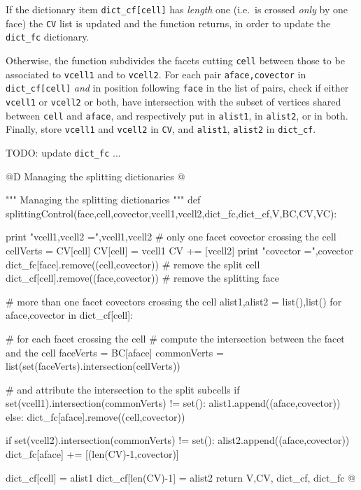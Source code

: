 \documentclass[11pt,oneside]{article}	%
\begin{document}
If the dictionary item \texttt{dict\_cf[cell]} has \emph{length} one (i.e.~is crossed  \emph{only} by one face) the \texttt{CV} list is updated and the function returns, in order to update the \texttt{dict\_fc} dictionary.

Otherwise, the function subdivides the facets cutting \texttt{cell} between those to be associated to \texttt{vcell1} and to \texttt{vcell2}. 
For each pair \texttt{aface,covector} in \texttt{dict\_cf[cell]} \emph{and} in position following \texttt{face} in the list of pairs, check if either \texttt{vcell1} or \texttt{vcell2} or both, have intersection with the subset of vertices shared between \texttt{cell} and \texttt{aface}, and respectively put in \texttt{alist1}, in \texttt{alist2}, or in both.
Finally, store \texttt{vcell1} and \texttt{vcell2} in \texttt{CV}, and \texttt{alist1}, \texttt{alist2} in \texttt{dict\_cf}.

TODO: update \texttt{dict\_fc} ...

@D Managing the splitting dictionaries
@{""" Managing the splitting dictionaries """
def splittingControl(face,cell,covector,vcell1,vcell2,dict_fc,dict_cf,V,BC,CV,VC):

   print "vcell1,vcell2 =",vcell1,vcell2
   # only one facet covector crossing the cell
   cellVerts = CV[cell]
   CV[cell] = vcell1
   CV += [vcell2]
   print "covector =",covector
   dict_fc[face].remove((cell,covector))   # remove the split cell
   dict_cf[cell].remove((face,covector))   # remove the splitting face
         
   # more than one facet covectors crossing the cell
   alist1,alist2 = list(),list()
   for aface,covector in dict_cf[cell]:
   
      # for each facet crossing the cell
      # compute the intersection between the facet and the cell
      faceVerts = BC[aface]
      commonVerts = list(set(faceVerts).intersection(cellVerts))
      
      # and attribute the intersection to the split subcells
      if set(vcell1).intersection(commonVerts) != set():
         alist1.append((aface,covector))
      else: dict_fc[aface].remove((cell,covector)) 
            
      if set(vcell2).intersection(commonVerts) != set():
         alist2.append((aface,covector))
         dict_fc[aface] += [(len(CV)-1,covector)]
   
   dict_cf[cell] = alist1  
   dict_cf[len(CV)-1] = alist2
   return V,CV, dict_cf, dict_fc
@}
\end{document}

